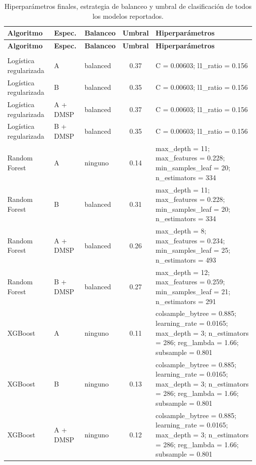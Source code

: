 \begin{longtable}{>{\raggedright\arraybackslash}p{}l l c>{\raggedright\arraybackslash}p{}}
  \caption{Hiperparámetros finales, estrategia de balanceo y umbral de clasificación de todos los modelos reportados.}
  \label{tab:hiperparametros} \\
  \toprule
  \textbf{Algoritmo} & \textbf{Espec.} & \textbf{Balanceo} & \textbf{Umbral} & \textbf{Hiperparámetros} \\
  \midrule
  \endfirsthead
  \toprule
  \textbf{Algoritmo} & \textbf{Espec.} & \textbf{Balanceo} & \textbf{Umbral} & \textbf{Hiperparámetros} \\
  \midrule
  \endhead
  \bottomrule
  \endlastfoot
  \multicolumn{5}{l}{\textbf{Pobreza monetaria, holdout temporal}} \\*
  Logística regularizada & A & balanced & 0.37 & C = 0.00603; l1\_ratio = 0.156 \\
  Logística regularizada & B & balanced & 0.35 & C = 0.00603; l1\_ratio = 0.156 \\
  Logística regularizada & A + DMSP & balanced & 0.37 & C = 0.00603; l1\_ratio = 0.156 \\
  Logística regularizada & B + DMSP & balanced & 0.35 & C = 0.00603; l1\_ratio = 0.156 \\
  Random Forest & A & ninguno & 0.14 & max\_depth = 11; max\_features = 0.228; min\_samples\_leaf = 20; n\_estimators = 334 \\
  Random Forest & B & balanced & 0.31 & max\_depth = 11; max\_features = 0.228; min\_samples\_leaf = 20; n\_estimators = 334 \\
  Random Forest & A + DMSP & balanced & 0.26 & max\_depth = 8; max\_features = 0.234; min\_samples\_leaf = 25; n\_estimators = 493 \\
  Random Forest & B + DMSP & balanced & 0.27 & max\_depth = 12; max\_features = 0.259; min\_samples\_leaf = 21; n\_estimators = 291 \\
  XGBoost & A & ninguno & 0.11 & colsample\_bytree = 0.885; learning\_rate = 0.0165; max\_depth = 3; n\_estimators = 286; reg\_lambda = 1.66; subsample = 0.801 \\
  XGBoost & B & ninguno & 0.13 & colsample\_bytree = 0.885; learning\_rate = 0.0165; max\_depth = 3; n\_estimators = 286; reg\_lambda = 1.66; subsample = 0.801 \\
  XGBoost & A + DMSP & ninguno & 0.12 & colsample\_bytree = 0.885; learning\_rate = 0.0165; max\_depth = 3; n\_estimators = 286; reg\_lambda = 1.66; subsample = 0.801 \\

\end{longtable}
